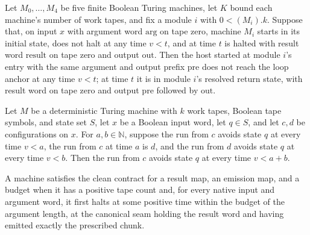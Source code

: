 \begin{lemma}
\label{Complexity.clA5Host_call}
\leanok
{}
Let $M_0,\ldots,M_4$ be five finite Boolean Turing machines, let $K$ bound each
machine's number of work tapes, and fix a module $i$ with $0<(M_i).k$. Suppose that, on
input $x$ with argument word $\mathrm{arg}$ on tape zero, machine $M_i$ starts in its
initial state, does not halt at any time $v<t$, and at time $t$ is halted with result
word $\mathrm{result}$ on tape zero and output $\mathrm{out}$. Then the host started at
module $i$'s entry with the same argument and output prefix $\mathrm{pre}$ does not
reach the loop anchor at any time $v<t$; at time $t$ it is in module $i$'s resolved
return state, with result word on tape zero and output $\mathrm{pre}$ followed by
$\mathrm{out}$.
\end{lemma}

\begin{lemma}
\label{Complexity.clA5_guard_add}
\leanok
{}
Let $M$ be a deterministic Turing machine with $k$ work tapes, Boolean tape symbols, and
state set $S$, let $x$ be a Boolean input word, let $q\in S$, and let $c,d$ be
configurations on $x$. For $a,b\in\mathbb{N}$, suppose the run from $c$ avoids state $q$
at every time $v<a$, the run from $c$ at time $a$ is $d$, and the run from $d$ avoids
state $q$ at every time $v<b$. Then the run from $c$ avoids state $q$ at every time
$v<a+b$.
\end{lemma}

\begin{definition}
\label{Complexity.CLA5Clean}
\leanok
{}
A machine satisfies the clean contract for a result map, an emission map, and a budget when it has a positive tape count and, for every native input and argument word, it first halts at some positive time within the budget of the argument length, at the canonical seam holding the result word and having emitted exactly the prescribed chunk.
\end{definition}

